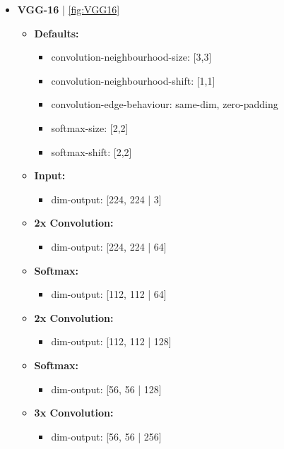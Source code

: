 \begin{itemize}
	\item[] \textbf{VGG-16} | \ref{fig:VGG16}
	\begin{itemize}
			\item[]\textbf{Defaults:} 
			\begin{itemize}
				\item[] convolution-neighbourhood-size: [3,3]
				\item[] convolution-neighbourhood-shift: [1,1]
				\item[] convolution-edge-behaviour: same-dim, zero-padding
				\item[] softmax-size: [2,2]
				\item[] softmax-shift: [2,2]
			\end{itemize}
			
			\item[]\textbf{Input:} 
			\begin{itemize}
				\item[] dim-output: [224, 224 | 3]
			\end{itemize}
			
			\item[]\textbf{2x Convolution:} 
			\begin{itemize}
				\item[] dim-output: [224, 224 | 64]
			\end{itemize}
			
			\item[]\textbf{Softmax:} 
			\begin{itemize}
				\item[] dim-output: [112, 112 | 64]
			\end{itemize}
			
			\item[]\textbf{2x Convolution:} 
			\begin{itemize}
				\item[] dim-output: [112, 112 | 128]
			\end{itemize}
			
			\item[]\textbf{Softmax:} 
			\begin{itemize}
				\item[] dim-output: [56, 56 | 128]				
			\end{itemize}
			
			\item[]\textbf{3x Convolution:} 
			\begin{itemize}
				\item[] dim-output: [56, 56 | 256]
			\end{itemize}
			

\end{itemize}
\end{itemize}
